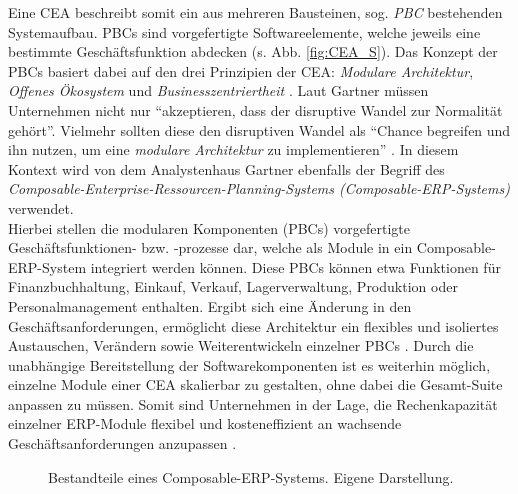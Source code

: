 Eine CEA beschreibt somit ein aus mehreren Bausteinen, sog. \textit{\ac{PBC}} bestehenden Systemaufbau. PBCs sind vorgefertigte Softwareelemente, welche jeweils eine bestimmte Geschäftsfunktion abdecken (s. Abb. \ref{fig:CEA_S}). Das Konzept der PBCs basiert dabei auf den drei Prinzipien der CEA: \textit{Modulare Architektur}, \textit{Offenes Ökosystem} und \textit{Businesszentriertheit} \cite{.20230313}. Laut Gartner müssen Unternehmen nicht nur \enquote{akzeptieren, dass der disruptive Wandel zur Normalität gehört}. Vielmehr sollten diese den disruptiven Wandel als \enquote{Chance begreifen und ihn nutzen, um eine \textit{modulare Architektur} zu implementieren} \cite{.20230313}. In diesem Kontext wird von dem Analystenhaus Gartner ebenfalls der Begriff des \textit{Composable-Enterprise-Ressourcen-Planning-Systems (Composable-\acs{ERP}-Systems)} verwendet. \\Hierbei stellen die modularen Komponenten (PBCs) vorgefertigte Geschäftsfunktio\-nen- bzw. -prozesse dar, welche als Module in ein Composable-ERP-System integriert werden können. Diese PBCs können etwa Funktionen für Finanzbuchhaltung, Einkauf, Verkauf, Lagerverwaltung, Produktion oder Personalmanagement enthalten. Ergibt sich eine Änderung in den Geschäftsanforderungen, ermöglicht diese Architektur ein flexibles und isoliertes Austauschen, Verändern sowie Weiterentwickeln einzelner PBCs \cite{Gartner.20230418}. Durch die unabhängige Bereitstellung der Softwarekomponenten ist es weiterhin möglich, einzelne Module einer CEA skalierbar zu gestalten, ohne dabei die Gesamt-Suite anpassen zu müssen. Somit sind Unternehmen in der Lage, die Rechenkapazität einzelner ERP-Module flexibel und kosteneffizient an wachsende Geschäftsanforderungen anzupassen \cite[7]{Sensedia.2020}.  
\begin{center}
	\begin{figure}[H]
		\centering
		\caption[Bestandteile eines Composable-ERP-Systems]{Bestandteile eines Composable-ERP-Systems. Eigene Darstellung.}
		\label{fig:CERP}
	\end{figure}	
\end{center}
\vspace*{-15mm}
